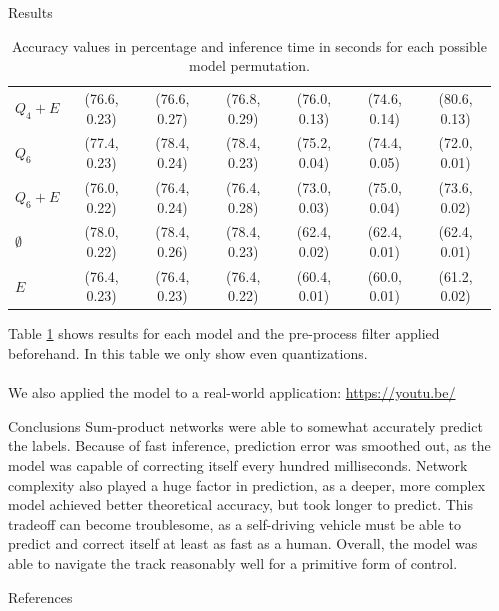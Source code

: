 \documentclass[final,hyperref={pdfpagelabels=false},notheorems]{beamer}
\theoremstyle{thesisstyle}
\begin{document}
\begin{frame}[t]
\begin{columns}[t]
\begin{column}{.5225\textwidth}
\begin{block}{Results}
\begin{table}[h]
\begin{tabular}{l|c|c|c|c|c|c}
          $Q_4+E$     & (76.6, 0.23) & (76.6, 0.27) & (76.8, 0.29) & (76.0, 0.13) & (74.6, 0.14) & (80.6, 0.13)\\
          $Q_6$       & (77.4, 0.23) & (78.4, 0.24) & (78.4, 0.23) & (75.2, 0.04) & (74.4, 0.05) & (72.0, 0.01)\\
          $Q_6+E$     & (76.0, 0.22) & (76.4, 0.24) & (76.4, 0.28) & (73.0, 0.03) & (75.0, 0.04) & (73.6, 0.02)\\
          $\emptyset$ & (78.0, 0.22) & (78.4, 0.26) & (78.4, 0.23) & (62.4, 0.02) & (62.4, 0.01) & (62.4, 0.01)\\
          $E$         & (76.4, 0.23) & (76.4, 0.23) & (76.4, 0.22) & (60.4, 0.01) & (60.0, 0.01) & (61.2, 0.02)\\
        \end{tabular}
        \caption{Accuracy values in percentage and inference time in seconds for each possible model
        permutation.\label{tab:accuracy}}
      \end{table}
      Table \ref{tab:accuracy} shows results for each model and the pre-process filter applied
      beforehand. In this table we only show even quantizations.\\~\\

      We also applied the model to a real-world application: \url{https://youtu.be/}
    \end{block}

    \begin{block}{Conclusions}
      Sum-product networks were able to somewhat accurately predict the labels. Because of fast
      inference, prediction error was smoothed out, as the model was capable of correcting itself
      every hundred milliseconds. Network complexity also played a huge factor in prediction, as a
      deeper, more complex model achieved better theoretical accuracy, but took longer to predict.
      This tradeoff can become troublesome, as a self-driving vehicle must be able to predict and
      correct itself at least as fast as a human. Overall, the model was able to navigate the track
      reasonably well for a primitive form of control.
    \end{block}

    \begin{block}{References}
      \linespread{0.928}\selectfont
      \printbibliography[heading=none]
    \end{block}

  \end{column}

  \begin{column}{.015\textwidth}\end{column} %

\end{columns} %

\end{frame} %
\end{document}
